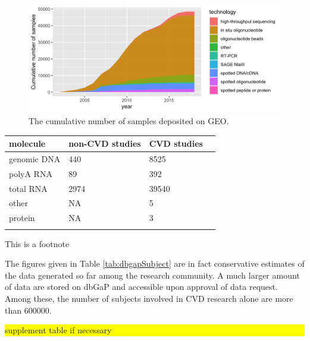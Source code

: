 \documentclass[letter]{bioinfo}
\newcommand{\todo}[1]{\colorbox{yellow}{\parbox{1\linewidth}{#1}}}
\begin{document}
\begin{figure}[!tpb]%
\includegraphics[width=1\linewidth]{gsm_count_by_tech.png}
	\caption{The cumulative number of samples deposited on GEO.}
	\label{fig:01}
\end{figure}

\begin{table}[!t]
	 {\begin{tabular}{@{}llll@{}}\toprule 
			molecule &non-CVD studies & CVD studies \\ \midrule
			genomic DNA &            440 &        8525  \\
			polyA RNA &             89 &         392  \\
			total RNA &           2974 &       39540  \\
			other &             NA &           5  \\
			protein &             NA &           3  \\ \botrule
	\end{tabular}}{This is a footnote}
\end{table}

The figures given in Table \ref{tab:dbgapSubject} are in fact conservative estimates of the data generated so far among the research community. A much larger amount of data are stored on dbGaP and accessible upon approval of data request. Among these, the number of subjects involved in CVD research alone are more than 600000. %

\todo{supplement table if necessary}
\end{document}
